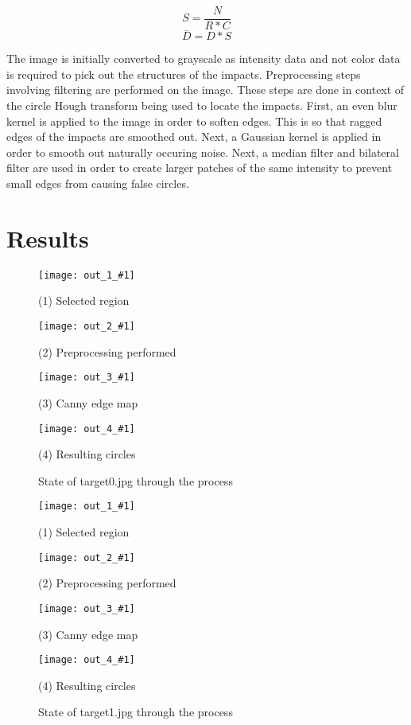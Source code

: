 \documentclass{article}
\begin{document}
\[S = \frac{N}{R * C}\]
\[\bar{D} = D * S\]

The image is initially converted to grayscale as intensity data and not color data is required
to pick out the structures of the impacts.
Preprocessing steps involving filtering are performed on the image. These steps are done
in context of the circle Hough transform being used to locate the impacts.
First, an even blur kernel is applied to the image in order to soften edges. This is so that
ragged edges of the impacts are smoothed out. Next, a Gaussian kernel is applied in order
to smooth out naturally occuring noise. Next, a median filter and bilateral filter are used in order
to create larger patches of the same intensity to prevent small edges from causing false circles.

\section{Results}
\label{sec:results}

\newcommand{\showsteps}[1] {
    \begin{figure}[htb]
    \begin{minipage}[b]{0.5\linewidth}
      \centering
      \centerline{\texttt{[image: out\_1\_\#1]}}
      \centerline{(1) Selected region}\medskip
    \end{minipage}%
    \begin{minipage}[b]{0.5\linewidth}
      \centering
      \centerline{\texttt{[image: out\_2\_\#1]}}
      \centerline{(2) Preprocessing performed}\medskip
    \end{minipage}
    
    \begin{minipage}[b]{0.5\linewidth}
      \centering
      \centerline{\texttt{[image: out\_3\_\#1]}}
      \centerline{(3) Canny edge map}\medskip
    \end{minipage}%
    \begin{minipage}[b]{0.5\linewidth}
      \centering
      \centerline{\texttt{[image: out\_4\_\#1]}}
      \centerline{(4) Resulting circles}\medskip
    \end{minipage}
    \caption{State of target#1.jpg through the process}
    \label{fig:res}
    \end{figure}
}

\showsteps{0}
\showsteps{1}



\end{document}

